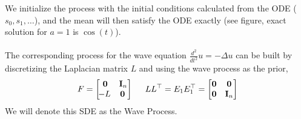 {    We initialize the process with the initial conditions calculated from the ODE ($s_0, s_1, \dots$), and the mean will then satisfy the ODE exactly (see figure, exact solution for $a=1$ is $\cos(t)$).
    \\
    \\
    The corresponding process for the wave equation $\frac{d^2}{dt^2}u = -\Delta u$ can be built by discretizing the Laplacian matrix $L$ and using the wave process as the prior, 
    $$F = \begin{bmatrix}
    \mathbf{0} &  \textbf{I}_n  \\ \!-L & \! \mathbf{0}
    \end{bmatrix} \hspace*{5mm} LL^\top = E_1E_1^\top = \begin{bmatrix}
    \mathbf{0} & \mathbf{0} \\ \mathbf{0} & \textbf{I}_n \end{bmatrix}$$
    We will denote this SDE as the Wave Process.
}

